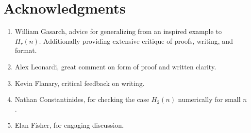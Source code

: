 \documentclass[12pt,reqno]{article}
\begin{document}
\section{Acknowledgments}
\begin{enumerate}
	\item{William Gasarch, advice for generalizing from an inspired example to $H_{r}(n)$. Additionally providing extensive critique of proofs, writing, and format.}
	\item{Alex Leonardi, great comment on form of proof and written clarity.}
	\item{Kevin Flanary, critical feedback on writing.}
	\item{Nathan Constantinides, for checking the case $H_{2}(n)$ numerically for small $n$.}
	\item{Elan Fisher, for engaging discussion.}
\end{enumerate}
\end{document}

